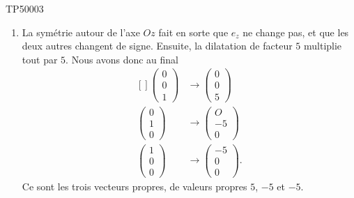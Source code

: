 \begin{corrige}{TP50003}
\begin{enumerate}
		\item
			La symétrie autour de l'axe $Oz$ fait en sorte que $e_z$ ne change pas, et que les deux autres changent de signe. Ensuite, la dilatation de facteur $5$ multiplie tout par $5$. Nous avons donc au final
			\begin{equation}
				\begin{aligned}[]
					\begin{pmatrix}
						0	\\ 
						0	\\ 
						1	
					\end{pmatrix}&\to\begin{pmatrix}
						0	\\ 
						0	\\ 
						5	
					\end{pmatrix}\\
					\begin{pmatrix}
						0	\\ 
						1	\\ 
						0	
					\end{pmatrix}&\to
					\begin{pmatrix}
						O	\\ 
						-5	\\ 
						0	
					\end{pmatrix}\\
					\begin{pmatrix}
						1	\\ 
						0	\\ 
						0	
					\end{pmatrix}&\to\begin{pmatrix}
						-5	\\ 
						0	\\ 
						0	
					\end{pmatrix}.
				\end{aligned}
			\end{equation}
			Ce sont les trois vecteurs propres, de valeurs propres $5$, $-5$ et $-5$.

	\end{enumerate}
	

\end{corrige}
